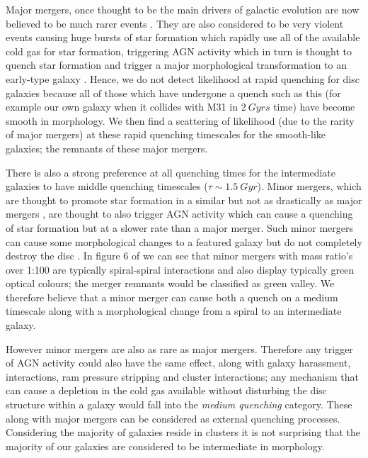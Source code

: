 \documentclass{mn2e}
\begin{document}
Major mergers, once thought to be the main drivers of galactic evolution \citep{WR78, KWG93, LC93, DeL06, BLB08} are now believed to be much rarer events \citep{Darg, Hopkins12, Brook12}. They are also considered to be very violent events causing huge bursts of star formation which rapidly use all of the available cold gas for star formation, triggering AGN activity which in turn is thought to quench star formation \citep{Sch10, Sanders88, Hopkins06, Sch2014} and trigger a major morphological transformation to an early-type galaxy \citep{BH96, Darg}. Hence, we do not detect likelihood at rapid quenching for disc galaxies because all of those which have undergone a quench such as this (for example our own galaxy when it collides with M31 in $2~Gyrs$ time) have become smooth in morphology. We then find a scattering of likelihood (due to the rarity of major mergers) at these rapid quenching timescales for the smooth-like galaxies; the remnants of these major mergers. 

There is also a strong preference at all quenching times for the intermediate galaxies to have middle quenching timescales ($\tau \sim 1.5~Gyr$). Minor mergers, which are thought to promote star formation in a similar but not as drastically as major mergers \citep{Darg, Kav09}, are thought to also trigger AGN activity \citep{Sch10, Sch2014} which can cause a quenching of star formation but at a slower rate than a major merger. Such minor mergers can cause some morphological changes to a featured galaxy but do not completely destroy the disc \citep{Darg}. In figure 6 of \citet{Darg} we can see that minor mergers with mass ratio's over 1:100 are typically spiral-spiral interactions and also display typically green optical colours; the merger remnants would be classified as green valley. We therefore believe that a minor merger can cause both a quench on a medium timescale along with a morphological change from a spiral to an intermediate galaxy.

However minor mergers are also as rare as major mergers. Therefore any trigger of AGN activity could also have the same effect, along with galaxy harassment, interactions, ram pressure stripping and cluster interactions; any mechanism that can cause a depletion in the cold gas available without disturbing the disc structure within a galaxy would fall into the \emph{medium quenching} category. These along with major mergers can be considered as external quenching processes. Considering the majority of galaxies reside in clusters it is not surprising that the majority of our galaxies are considered to be intermediate in morphology. 
\end{document}
